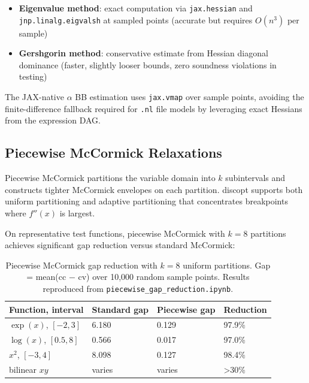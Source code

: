 \documentclass[12pt,preprint]{article}
\begin{document}
\begin{itemize}
\item \textbf{Eigenvalue method}: exact computation via \texttt{jax.hessian} and \texttt{jnp.linalg.eigvalsh} at sampled points (accurate but requires $O(n^3)$ per sample)

\item \textbf{Gershgorin method}: conservative estimate from Hessian diagonal dominance (faster, slightly looser bounds, zero soundness violations in testing)

\end{itemize}


The JAX-native $\alpha$ BB estimation uses \texttt{jax.vmap} over sample points, avoiding the finite-difference fallback required for \texttt{.nl} file models by leveraging exact Hessians from the expression DAG.

\subsection{Piecewise McCormick Relaxations}
\label{org-piecewise-mccormick-relaxations}
Piecewise McCormick \cite{Castro2015} partitions the variable domain into $k$ subintervals and constructs tighter McCormick envelopes on each partition. discopt supports both uniform partitioning and adaptive partitioning that concentrates breakpoints where $f''(x)$ is largest.


On representative test functions, piecewise McCormick with $k=8$ partitions achieves significant gap reduction versus standard McCormick:


\begin{table}[htbp]
\centering
\begin{tabular}{llll}
\toprule
Function, interval & Standard gap & Piecewise gap & Reduction \\
\midrule
$\exp(x)$, $[-2,3]$ & 6.180 & 0.129 & 97.9\% \\
$\log(x)$, $[0.5,8]$ & 0.566 & 0.017 & 97.0\% \\
$x^2$, $[-3,4]$ & 8.098 & 0.127 & 98.4\% \\
bilinear $xy$ & varies & varies & >30\% \\
\bottomrule
\end{tabular}
\caption{Piecewise McCormick gap reduction with $k=8$ uniform partitions. Gap = mean(cc $-$ cv) over 10,000 random sample points. Results reproduced from \texttt{piecewise\_gap\_reduction.ipynb}.}
\label{tab-piecewise}
\end{table}
\end{document}
